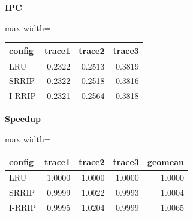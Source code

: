 \documentclass[10pt]{article}
\begin{document}
\begin{center}
\begin{minipage}[t]{0.48\linewidth}\centering
\textbf{IPC}\\[3pt]
\begin{adjustbox}{max width=\linewidth}
\begin{tabular}{@{}lrrr@{}}
\toprule
\textbf{config} & \textbf{trace1} & \textbf{trace2} & \textbf{trace3} \\
\midrule
LRU & 0.2322 & 0.2513 & 0.3819 \\
SRRIP & 0.2322 & 0.2518 & 0.3816 \\
I-RRIP & 0.2321 & 0.2564 & 0.3818 \\
\bottomrule
\end{tabular}
\end{adjustbox}
\end{minipage}\hfill
\begin{minipage}[t]{0.48\linewidth}\centering
\textbf{Speedup}\\[3pt]
\begin{adjustbox}{max width=\linewidth}
\begin{tabular}{@{}lrrrr@{}}
\toprule
\textbf{config} & \textbf{trace1} & \textbf{trace2} & \textbf{trace3} & \textbf{geomean} \\
\midrule
LRU & 1.0000 & 1.0000 & 1.0000 & 1.0000 \\
SRRIP & 0.9999 & 1.0022 & 0.9993 & 1.0004 \\
I-RRIP & 0.9995 & 1.0204 & 0.9999 & 1.0065 \\
\bottomrule
\end{tabular}
\end{adjustbox}
\end{minipage}
\end{center}
\medskip
\end{document}
